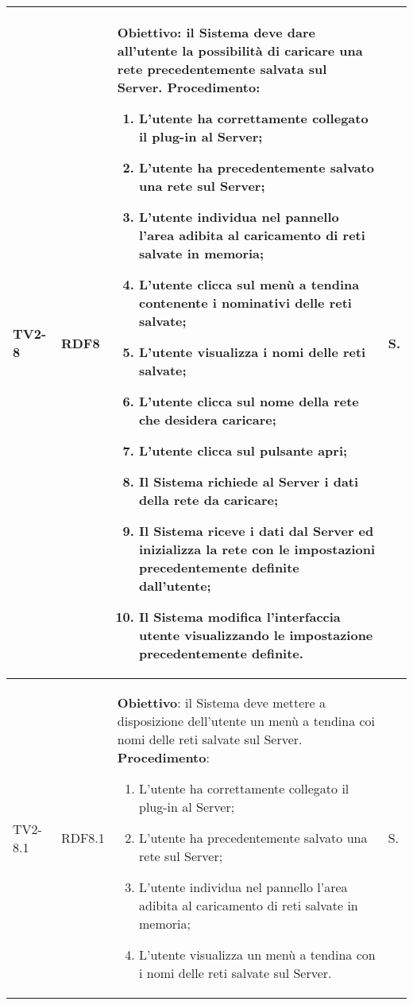 \begin{longtable}{|C{.15\textwidth}|C{.13\textwidth}|m{.65\textwidth}|C{.08\textwidth}|}
TV2-8 & RDF8 &
	\textbf{Obiettivo}: il Sistema deve dare all'utente la possibilità di caricare una rete precedentemente salvata sul Server. \newline
	\textbf{Procedimento}:
	\begin{enumerate}
		\item L'utente ha correttamente collegato il plug-in al Server;
		\item L'utente ha precedentemente salvato una rete sul Server;
		\item L'utente individua nel pannello l'area adibita al caricamento di reti salvate in memoria;
		\item L'utente clicca sul menù a tendina contenente i nominativi delle reti salvate;
		\item L'utente visualizza i nomi delle reti salvate;
		\item L'utente clicca sul nome della rete che desidera caricare;
		\item L'utente clicca sul pulsante apri;
		\item Il Sistema richiede al Server i dati della rete da caricare;
		\item Il Sistema riceve i dati dal Server ed inizializza la rete con le impostazioni precedentemente definite dall'utente;
		\item Il Sistema modifica l'interfaccia utente visualizzando le impostazione precedentemente definite.
	\end{enumerate}
	& S. \\
\hline

TV2-8.1 & RDF8.1 &
	\textbf{Obiettivo}: il Sistema deve mettere a disposizione dell'utente un menù a tendina coi nomi delle reti salvate sul Server. \newline
	\textbf{Procedimento}:
	\begin{enumerate}
		\item L'utente ha correttamente collegato il plug-in al Server;
		\item L'utente ha precedentemente salvato una rete sul Server;
		\item L'utente individua nel pannello l'area adibita al caricamento di reti salvate in memoria;
		\item L'utente visualizza un menù a tendina con i nomi delle reti salvate sul Server.
	\end{enumerate}
	& S. \\
\hline


\end{longtable}
